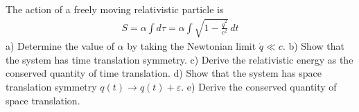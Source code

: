 \documentclass[12pt]{book} %
\numberwithin{equation}{chapter}
\def\a{\alpha}
\def\e{\varepsilon}
\def\t{\tau}
\begin{document}
\begin{problem}
The action of a freely moving relativistic particle is
\begin{align*}
S=\a \int d\t=\a \int\sqrt{1-\frac{\dot{q}^{2}}{c^{2}}}\,dt
\end{align*}
a) Determine the value of $\a$ by taking the Newtonian limit $\dot{q}\ll c$.\bigskip\newline
b) Show that the system has time translation symmetry.\bigskip\newline
c) Derive the relativistic energy as the conserved quantity of time translation.\bigskip\newline
d) Show that the system has space translation symmetry $q(t)\to q(t)+\e$.\bigskip\newline
e) Derive the conserved quantity of space translation.
\end{problem}
\end{document}
